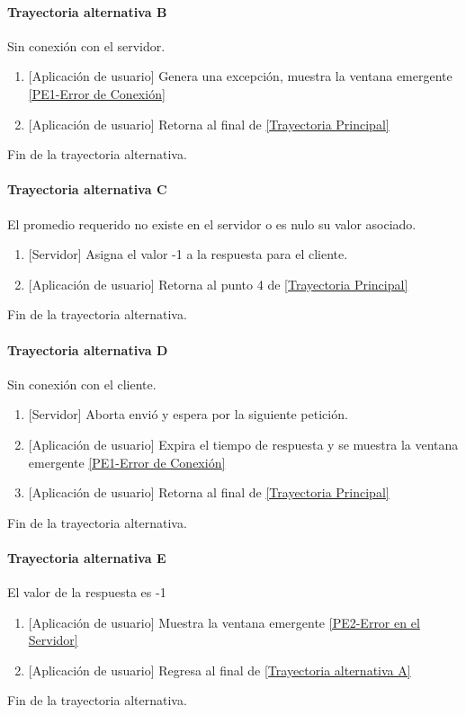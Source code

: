 \paragraph{Trayectoria alternativa B} \label{SUB-M-CU5:TB}
	Sin conexión con el servidor.
	\begin{enumerate}[label=B\arabic*.]
		\item {[Aplicación de usuario]} Genera una excepción, muestra la ventana emergente \hyperref[fig:Error de Conexion]{[PE1-Error de Conexión]}
		\item {[Aplicación de usuario]} Retorna al final de \hyperref[SUB-M-CU6:TP]{[Trayectoria Principal]} 
	\end{enumerate}
	Fin de la trayectoria alternativa.

\paragraph{Trayectoria alternativa C} \label{SUB-M-CU6:TC}
	El promedio requerido no existe en el servidor o es nulo su valor asociado.
	\begin{enumerate}[label=C\arabic*.]
		\item {[Servidor]} Asigna el valor -1 a la respuesta para el cliente.
		\item {[Aplicación de usuario]} Retorna al punto 4 de \hyperref[SUB-M-CU6:TP]{[Trayectoria Principal]}
	\end{enumerate}
	Fin de la trayectoria alternativa.

\paragraph{Trayectoria alternativa D} \label{SUB-M-CU6:TD}
	Sin conexión con el cliente.
	\begin{enumerate}[label=D\arabic*.]
		\item {[Servidor]} Aborta envió y espera por la siguiente petición.
		\item {[Aplicación de usuario]} Expira el tiempo de respuesta y se muestra la ventana emergente \hyperref[fig:Error de Conexion]{[PE1-Error de Conexión]}
		\item {[Aplicación de usuario]} Retorna al final de \hyperref[SUB-M-CU6:TP]{[Trayectoria Principal]} 
	\end{enumerate}
	Fin de la trayectoria alternativa.
	
\paragraph{Trayectoria alternativa E} \label{SUB-M-CU6:TE}
	El valor de la respuesta es -1
	\begin{enumerate}[label=E\arabic*.]
		\item {[Aplicación de usuario]} Muestra la ventana emergente \hyperref[fig:Error en el Servidor]{[PE2-Error en el Servidor]}
		\item {[Aplicación de usuario]} Regresa al final de \hyperref[SUB-M-CU6:TA]{[Trayectoria alternativa A]}
	\end{enumerate}
	Fin de la trayectoria alternativa.